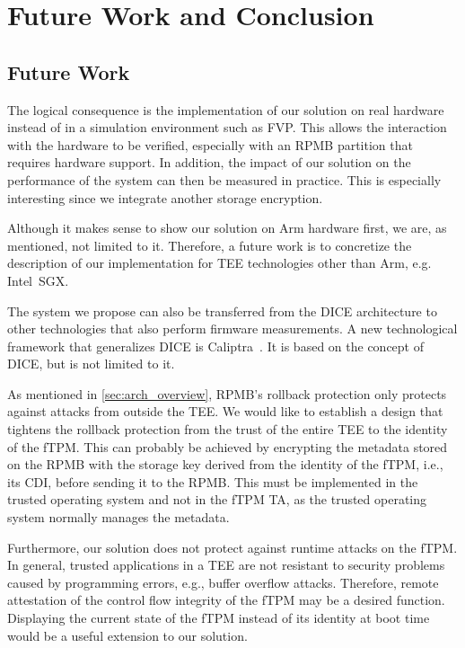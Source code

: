 
\chapter{Future Work and Conclusion}\label{chapter:future_work_and_conclusion}

\section{Future Work}

The logical consequence is the implementation of our solution on real hardware instead of in a simulation environment such as FVP\@.
This allows the interaction with the hardware to be verified, especially with an RPMB partition that requires hardware support.
In addition, the impact of our solution on the performance of the system can then be measured in practice.
This is especially interesting since we integrate another storage encryption.

Although it makes sense to show our solution on Arm hardware first, we are, as mentioned, not limited to it.
Therefore, a future work is to concretize the description of our implementation for TEE technologies other than Arm, e.g. Intel~SGX\@.

The system we propose can also be transferred from the DICE architecture to other technologies that also perform firmware measurements.
A new technological framework that generalizes DICE is Caliptra~\cite{caliptra}.
It is based on the concept of DICE, but is not limited to it.

As mentioned in \autoref{sec:arch_overview}, RPMB's rollback protection only protects against attacks from outside the TEE\@.
We would like to establish a design that tightens the rollback protection from the trust of the entire TEE to the identity of the fTPM\@.
This can probably be achieved by encrypting the metadata stored on the RPMB with the storage key derived from the identity of the fTPM, i.e., its CDI, before sending it to the RPMB\@.
This must be implemented in the trusted operating system and not in the fTPM TA, as the trusted operating system normally manages the metadata.

Furthermore, our solution does not protect against runtime attacks on the fTPM\@.
In general, trusted applications in a TEE are not resistant to security problems caused by programming errors, e.g., buffer overflow attacks.
Therefore, remote attestation of the control flow integrity of the fTPM may be a desired function.
Displaying the current state of the fTPM instead of its identity at boot time would be a useful extension to our solution.

